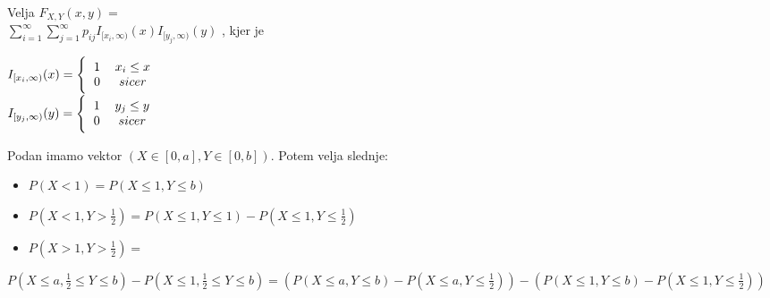 \documentclass{article}
\begin{document}
\begin{multicols}{2}
\begin{enumerate}
\begin{center}
        \end{center}
        Velja
        \begin{math}
            F_{X,Y}(x, y) =
        \end{math}\\
        \begin{math}
            \sum_{i = 1}^{\infty} \sum_{j = 1}^{\infty} p_{ij}  I_{[x_i, \infty)} (x) I_{[y_j, \infty)} (y)
        \end{math}
        , kjer je
        \begin{center}
            \begin{math}
                I_{[x_i, \infty)} (x) = 
                \Bigg\{\begin{tabular}{cc}
                    $1$  & $x_i \leq x$ \\
                    $0$  & $sicer$ \\
                  \end{tabular}
            \end{math} \\
            \begin{math}
                I_{[y_j, \infty)} (y) = 
                \Bigg\{\begin{tabular}{cc}
                    $1$  & $y_j \leq y$ \\
                    $0$  & $sicer$ \\
                  \end{tabular}
            \end{math}
        \end{center}
\end{enumerate}
Podan imamo vektor $(X \in [0, a], Y \in [0,b])$. Potem velja slednje:
\begin{itemize}
    \item $P(X < 1 ) = P(X \leq 1, Y \leq b)$
    \item $P(X < 1, Y > \frac{1}{2}) = P(X \leq 1, Y \leq 1) - P(X \leq 1, Y \leq \frac{1}{2})$
    \item \begin{math}
        P(X > 1, Y > \frac{1}{2}) = 
    \end{math}
\end{itemize}
\begin{center}
    \begin{small}
        \begin{math}
            P(X \leq a, \frac{1}{2} \leq Y \leq b) - P(X \leq 1, \frac{1}{2} \leq Y \leq b) =
            (P(X \leq a, Y \leq b) - P(X \leq a, Y \leq \frac{1}{2})) - (P(X \leq 1, Y \leq b) - P(X \leq 1, Y \leq \frac{1}{2}))
        \end{math}
    \end{small}
\end{center}


\end{multicols}
\end{document}
